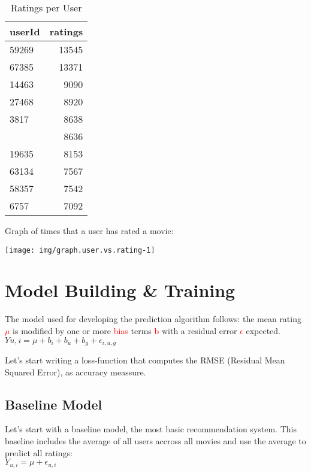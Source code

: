 \documentclass[]{article}
\begin{document}
\begin{table}[!h]

\caption{\label{tab:table.user.per.rating}Ratings per User}
\centering
\begin{tabular}{lr}
\toprule
userId & ratings\\
\midrule
\rowcolor{gray!6}  59269 & 13545\\
67385 & 13371\\
\rowcolor{gray!6}  14463 & 9090\\
27468 & 8920\\
\rowcolor{gray!6}  3817 & 8638\\
\addlinespace
68259 & 8636\\
\rowcolor{gray!6}  19635 & 8153\\
63134 & 7567\\
\rowcolor{gray!6}  58357 & 7542\\
6757 & 7092\\
\bottomrule
\end{tabular}
\end{table}

Graph of times that a user has rated a movie:

\begin{center}\texttt{[image: img/graph.user.vs.rating-1]} \end{center}

\pagebreak

\hypertarget{model-building-training}{%
\section{Model Building \& Training}\label{model-building-training}}

The model used for developing the prediction algorithm follows: the mean
rating \textcolor{red}{${\mu}$} is modified by one or more
\textcolor{red}{bias} terms \textcolor{red}{b} with a residual error
\textcolor{red}{$\epsilon$} expected.\\
\(Y{u,i} = \mu + b_{i} + b_{u} + b_{g} + \epsilon_{i,u,g}\)

Let's start writing a loss-function that computes the RMSE (Residual
Mean Squared Error), as accuracy meassure.

\hypertarget{baseline-model}{%
\subsection{Baseline Model}\label{baseline-model}}

Let's start with a baseline model, the most basic recommendation system.
This baseline includes the average of all users accross all movies and
use the average to predict all ratings:\\
\(Y_{u,i} = \mu + \epsilon_{u,i}\)
\end{document}
